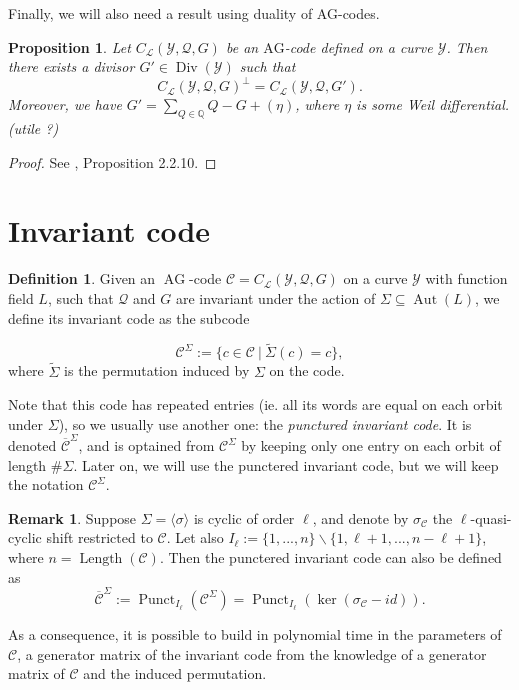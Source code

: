 \documentclass[10pt]{article}
\newtheorem{prop1}[thm]{Proposition}
\theoremstyle{definition}
\newtheorem{rq1}[thm]{Remark}
\theoremstyle{definition}
\theoremstyle{definition}
\newtheorem{def1}[thm]{Definition}
\newcommand{\s}{\vspace{0.3cm}}
\newcommand{\C}{\mathcal{C}}
\newcommand{\Q}{\mathbb{Q}}
\newcommand{\su}{\subseteq}
\newcommand{\Y}{\mathcal{Y}}
\newcommand{\QR}{\mathcal{Q}}
\newcommand{\Div}{\operatorname{Div}}
\newcommand{\Aut}{\operatorname{Aut}}
\newcommand{\ag}{\operatorname{AG}}
\newcommand{\calL}{\mathcal{L}}
\begin{document}
\s

Finally, we will also need a result using duality of AG-codes.

\s

\begin{prop1} \label{dual}
Let $C_{\calL}(\Y,\QR,G)$ be an $\mathrm{AG}$-code defined on a curve $\Y$. Then there exists a divisor $G' \in \Div(\Y)$ such that 
\[C_{\calL}(\Y,\QR,G)^{\perp} = C_{\calL}(\Y,\QR,G').\]
\color{purple} Moreover, we have $G'=\sum\limits_{Q \in \Q} Q -G + (\eta)$, where $\eta$ is some Weil differential. (utile ?) \color{black}
\end{prop1}

\s

\begin{proof}
See \cite{Sti}, Proposition 2.2.10.
\end{proof}

\section{Invariant code}

\s

\begin{def1} Given an $\ag$-code $\mathcal{C} = C_{\calL}(\Y,\QR,G)$ on a curve $\Y$ with function field $L$, such that $\QR$ and $G$ are invariant under the action of $\Sigma \su \Aut(L)$, we define its invariant code as the subcode 

\[\mathcal{C}^{\Sigma} := \{c \in \mathcal{C} \ | \ \tilde{\Sigma}(c)=c\},\]
where $\tilde{\Sigma}$ is the permutation induced by $\Sigma$ on the code.
\end{def1}
\s

\color{purple}

Note that this code has repeated entries (ie. all its words are equal on each orbit under $\Sigma$), so we usually use another one: the \emph{punctured invariant code}. It is denoted $\overline{\mathcal{C}}^{\Sigma}$, and is optained from $\C^{\Sigma}$ by keeping only one entry on each orbit of length $\#\Sigma$. Later on, we will use the punctered invariant code, but we will keep the notation $\mathcal{C}^{\Sigma}$. 

\s

\begin{rq1}  \label{gen inv}
Suppose $\Sigma = \langle \sigma \rangle$ is cyclic of order $\ell$, and denote by $\sigma_{\mathcal{C}}$ the $\ell$-quasi-cyclic shift restricted to $\mathcal{C}$. Let also $I_{\ell} := \{1,...,n\}\backslash \{1,\ell+1,...,n-\ell+1\}$, where $n=\operatorname{Length}(\mathcal{C})$. Then the punctered invariant code can also be defined as
\[ \overline{\mathcal{C}}^{\Sigma} := \operatorname{Punct}_{I_{\ell}}(\mathcal{C}^{\Sigma}) = \operatorname{Punct}_{ I_{\ell}}(\ker (\sigma_{\mathcal{C}}-id)).\]

\s

As a consequence, it is possible to build in polynomial time in the parameters of $\mathcal{C}$, a generator matrix of the invariant code from the knowledge of a generator matrix of $\mathcal{C}$ and the induced permutation. 
\end{rq1}
\color{black}
\end{document}
